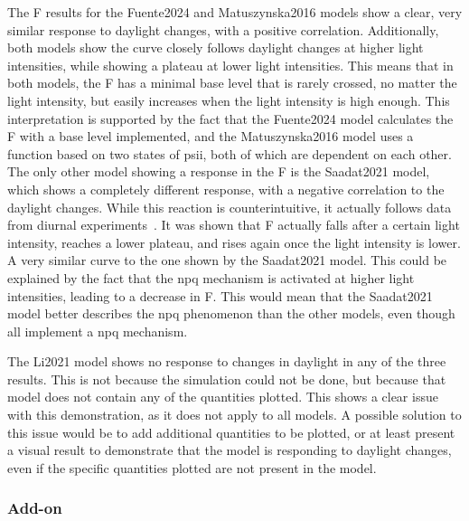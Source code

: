 The \gls{F} results for the Fuente2024 and Matuszynska2016 models show a clear, very similar response to daylight changes, with a positive correlation. Additionally, both models show the curve closely follows daylight changes at higher light intensities, while showing a plateau at lower light intensities. This means that in both models, the \gls{F} has a minimal base level that is rarely crossed, no matter the light intensity, but easily increases when the light intensity is high enough. This interpretation is supported by the fact that the Fuente2024 model calculates the \gls{F} with a base level implemented, and the Matuszynska2016 model uses a function based on two states of \gls{psii}, both of which are dependent on each other. The only other model showing a response in the \gls{F} is the Saadat2021 model, which shows a completely different response, with a negative correlation to the daylight changes. While this reaction is counterintuitive, it actually follows data from diurnal experiments~\cite{oivukkamakiFieldIntegrationShoot2024}. It was shown that \gls{F} actually falls after a certain light intensity, reaches a lower plateau, and rises again once the light intensity is lower. A very similar curve to the one shown by the Saadat2021 model. This could be explained by the fact that the \gls{npq} mechanism is activated at higher light intensities, leading to a decrease in \gls{F}. This would mean that the Saadat2021 model better describes the \gls{npq} phenomenon than the other models, even though all implement a \gls{npq} mechanism.

The Li2021 model shows no response to changes in daylight in any of the three results. This is not because the simulation could not be done, but because that model does not contain any of the quantities plotted. This shows a clear issue with this demonstration, as it does not apply to all models. A possible solution to this issue would be to add additional quantities to be plotted, or at least present a visual result to demonstrate that the model is responding to daylight changes, even if the specific quantities plotted are not present in the model.

\subsubsection{ Add-on}

